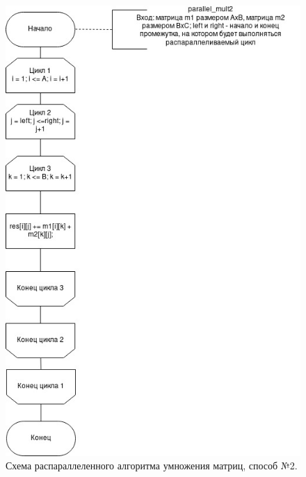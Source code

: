 \documentclass[12pt]{report}
\begin{document}
\begin{figure}[h]
	\centering
	\includegraphics[scale=0.85]{parallel2.jpg}
	\caption{Схема распараллеленного алгоритма умножения матриц, способ №2.}
	\label{fig:mpr}
\end{figure}
\end{document}
